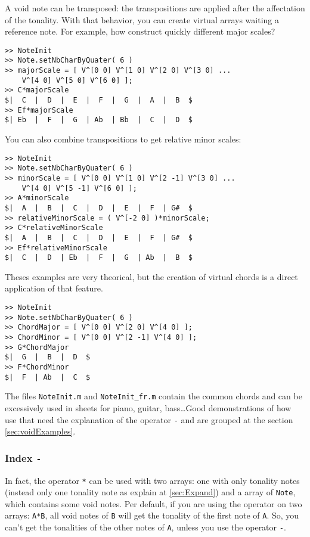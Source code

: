 \documentclass{article}
\newcommand{\note}{\lstinline!Note!\xspace}
\newcommand{\file}[1]{\texttt{#1}\xspace}
\newcommand{\noteInitFile}{\file{NoteInit.m}}
\newcommand{\noteInitFrFile}{\file{NoteInit\_fr.m}}
\begin{document}
A void note can be transposed: the transpositions are applied after the affectation of the tonality. With that behavior, you can create virtual arrays waiting a reference note. For example, how construct quickly different major scales?
\begin{lstlisting}
>> NoteInit
>> Note.setNbCharByQuater( 6 )
>> majorScale = [ V^[0 0] V^[1 0] V^[2 0] V^[3 0] ...
	V^[4 0] V^[5 0] V^[6 0] ];
>> C*majorScale               
$|  C  |  D  |  E  |  F  |  G  |  A  |  B  $
>> Ef*majorScale
$| Eb  |  F  |  G  | Ab  | Bb  |  C  |  D  $
\end{lstlisting}
You can also combine transpositions to get relative minor scales:
\begin{lstlisting}
>> NoteInit
>> Note.setNbCharByQuater( 6 )
>> minorScale = [ V^[0 0] V^[1 0] V^[2 -1] V^[3 0] ...
	V^[4 0] V^[5 -1] V^[6 0] ]; 
>> A*minorScale                                                               
$|  A  |  B  |  C  |  D  |  E  |  F  | G#  $
>> relativeMinorScale = ( V^[-2 0] )*minorScale;
>> C*relativeMinorScale
$|  A  |  B  |  C  |  D  |  E  |  F  | G#  $
>> Ef*relativeMinorScale
$|  C  |  D  | Eb  |  F  |  G  | Ab  |  B  $
\end{lstlisting}

Theses examples are very theorical, but the creation of virtual chords is a direct application of that feature.
\begin{lstlisting}
>> NoteInit
>> Note.setNbCharByQuater( 6 )
>> ChordMajor = [ V^[0 0] V^[2 0] V^[4 0] ];
>> ChordMinor = [ V^[0 0] V^[2 -1] V^[4 0] ];
>> G*ChordMajor
$|  G  |  B  |  D  $
>> F*ChordMinor 
$|  F  | Ab  |  C  $
\end{lstlisting}
The files \noteInitFile and \noteInitFrFile contain the common chords and can be excessively used in sheets for piano, guitar, bass\dots Good demonstrations of how use that need the explanation of the operator \lstinline!-! and are grouped at the section \ref{sec:voidExamples}.

\subsubsection{Index \lstinline!-!}
\label{sec:Index}

In fact, the operator \lstinline!*! can be used with two arrays: one with only tonality notes (instead only one tonality note as explain at \ref{sec:Expand}) and a array of \note, which contains some void notes. Per default, if you are using the operator on two arrays: \lstinline!A*B!, all void notes of \lstinline!B! will get the tonality of the first note of \lstinline!A!. So, you can't get the tonalities of the other notes of \lstinline!A!, unless you use the operator \lstinline!-!.
\end{document}
